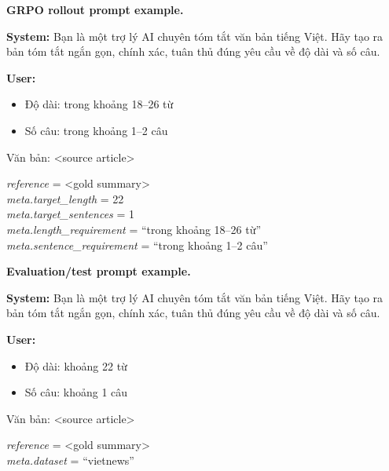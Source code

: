 \documentclass[11pt]{article}
\newcommand{\vn}[1]{{\vietfont #1}}
\newenvironment{vnblock}{\begingroup\vietfont}{\endgroup}
\begin{document}
\medskip
\noindent\textbf{GRPO rollout prompt example.}\par\smallskip
\noindent\colorbox{promptbg}{%
\begin{minipage}{\dimexpr\textwidth-2\fboxsep\relax}
\small\vspace{4pt}
\textbf{System:} \vn{Bạn là một trợ lý AI chuyên tóm tắt văn bản tiếng Việt. Hãy tạo ra bản tóm tắt ngắn gọn, chính xác, tuân thủ đúng yêu cầu về độ dài và số câu.}

\smallskip
\textbf{User:}
\begin{vnblock}
\begin{itemize}
  \item Độ dài: trong khoảng 18--26 từ
  \item Số câu: trong khoảng 1--2 câu
\end{itemize}
\vn{Văn bản:} \textless{}source article\textgreater
\end{vnblock}

\smallskip
\textit{reference} = \textless{}gold summary\textgreater\\
\textit{meta.target\_length} = 22\\
\textit{meta.target\_sentences} = 1\\
\textit{meta.length\_requirement} = ``\vn{trong khoảng 18--26 từ}''\\
\textit{meta.sentence\_requirement} = ``\vn{trong khoảng 1--2 câu}''
\vspace{4pt}
\end{minipage}}

\medskip
\noindent\textbf{Evaluation/test prompt example.}\par\smallskip
\noindent\colorbox{promptbg}{%
\begin{minipage}{\dimexpr\textwidth-2\fboxsep\relax}
\small\vspace{4pt}
\textbf{System:} \vn{Bạn là một trợ lý AI chuyên tóm tắt văn bản tiếng Việt. Hãy tạo ra bản tóm tắt ngắn gọn, chính xác, tuân thủ đúng yêu cầu về độ dài và số câu.}

\smallskip
\textbf{User:}
\begin{vnblock}
\begin{itemize}
  \item Độ dài: khoảng 22 từ
  \item Số câu: khoảng 1 câu
\end{itemize}
\vn{Văn bản:} \textless{}source article\textgreater
\end{vnblock}

\smallskip
\textit{reference} = \textless{}gold summary\textgreater\\
\textit{meta.dataset} = ``vietnews''
\vspace{4pt}
\end{minipage}}
\end{document}

